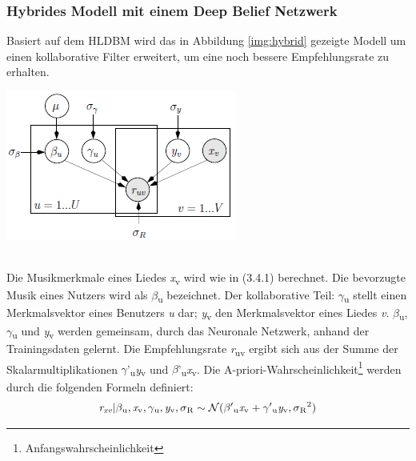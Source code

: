 \documentclass[twosided,a4,10pt]{article}
\begin{document}
\begin{multicols}{2}
		\subsubsection{Hybrides Modell mit einem Deep Belief Netzwerk}
		Basiert auf dem HLDBM wird das in Abbildung \ref{img:hybrid} gezeigte Modell um einen kollaborative Filter erweitert, um eine noch bessere Empfehlungsrate zu erhalten.
		\begin{minipage}{0.45\textwidth}
			\centering
			\includegraphics{img/hybrid.png}
			\label{img:hybrid}
		\end{minipage}\newline\\
		Die Musikmerkmale eines Liedes \textit{x}\textsubscript{v} wird wie in (3.4.1) berechnet. Die bevorzugte Musik eines Nutzers wird als $\beta$\textsubscript{u} bezeichnet. Der kollaborative Teil: $\gamma$\textsubscript{u} stellt einen Merkmalsvektor eines Benutzers \textit{u} dar; \textit{y}\textsubscript{v} den Merkmalsvektor eines Liedes \textit{v}. $\beta$\textsubscript{u}, $\gamma$\textsubscript{u} und \textit{y}\textsubscript{v} werden gemeinsam, durch das Neuronale Netzwerk, anhand der Trainingsdaten gelernt. Die Empfehlungsrate \textit{r}\textsubscript{uv} ergibt sich aus der Summe der Skalarmultiplikationen  $\gamma$'\textsubscript{u}\textit{y}\textsubscript{v} und  $\beta$'\textsubscript{u}\textit{x}\textsubscript{v}. Die A-priori-Wahrscheinlichkeit\footnote[20]{Anfangswahrscheinlichkeit} werden durch die folgenden Formeln definiert:\newline
		\begin{equation*}
		\centering
		\textit{r\textsubscript{xv}}|\beta\textsubscript{u},\textit{x}\textsubscript{v},\gamma\textsubscript{u},\textit{y}\textsubscript{v},\sigma\textsubscript{R}\sim\mathcal{N}(\beta'\textsubscript{u}\textit{x}\textsubscript{v} + \gamma'\textsubscript{u}\textit{y}\textsubscript{v},\sigma\textsubscript{R}\textsuperscript{2})
		\end{equation*}

\end{multicols}
\end{document}
